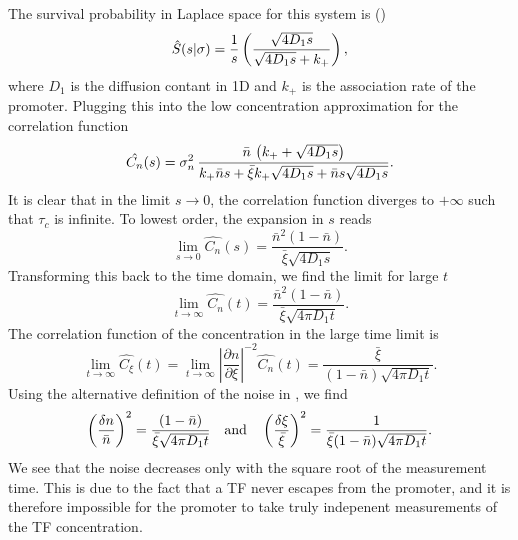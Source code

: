 The survival probability in Laplace space for this system is ()
\begin{equation}
 \hat{S}(s|\sigma) = \frac{1}{s}\left( \frac{\sqrt{4 D_1 s}}{\sqrt{4 D_1 s} + k_+} \right),
 \elabel{LSx0}
\end{equation}
where $D_1$ is the diffusion contant in 1D and $k_+$ is the association rate of the promoter. Plugging this into the low concentration approximation for the correlation function 
\begin{equation}
  \hat{C_n}(s) = \sigma_n^2 \, \frac{\bar{n} \, \left( k_+ + \sqrt{4 D_1 s} \right)}{k_+ \bar{n} s + \bar{\xi} k_+ \sqrt{4 D_1 s} + \bar{n} s \sqrt{4 D_1 s}}.
  \elabel{LapCorr1D}
\end{equation}
It is clear that in the limit $s \to 0$, the correlation function diverges to $+\infty$ such that $\tau_c$ is infinite. To lowest order, the expansion in $s$ reads
\begin{equation}
 \lim_{s \to 0} \hat{C_n}(s) = \frac{\bar{n}^2(1-\bar{n})}{\bar{\xi} \sqrt{4 D_1 s}}.
\end{equation}
Transforming this back to the time domain, we find the limit for large $t$
\begin{equation}
 \lim_{t \to \infty} \hat{C_n}(t) = \frac{\bar{n}^2(1-\bar{n})}{\bar{\xi} \sqrt{4 \pi D_1 t}}.
\end{equation}
The correlation function of the concentration in the large time limit is
\begin{equation}
 \lim_{t \to \infty} \hat{C_{\xi}}(t) = \lim_{t \to \infty} \left| \frac{\partial n}{\partial \xi} \right|^{-2} \hat{C_n}(t) = \frac{\bar{\xi}}{(1 - \bar{n}) \sqrt{4 \pi D_1 t}}.
\end{equation}
Using the alternative definition of the noise in , we find
\begin{equation}
 \left( \frac{\delta n}{\bar{n}} \right)^2 =  \frac{(1-\bar{n})}{\bar{\xi} \sqrt{4 \pi D_1 t}} \quad \text{and} \quad \left( \frac{\delta \xi}{\bar{\xi}} \right)^2 = \frac{1}{ \bar{\xi} (1 - \bar{n}) \sqrt{4 \pi D_1 t}}. 
 \elabel{Noise1D}
\end{equation}
We see that the noise decreases only with the square root of the measurement time. This is due to the fact that a TF never escapes from the promoter, and it is therefore impossible for the promoter to take truly indepenent measurements of the TF concentration. 


